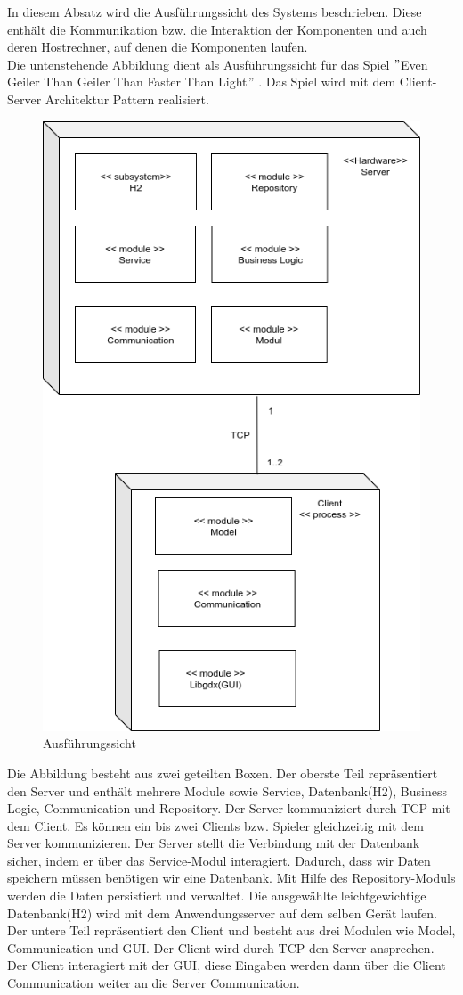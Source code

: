 \documentclass[fontsize=12pt,paper=a4,twoside]{scrartcl}
\begin{document}
In diesem Absatz wird die Ausführungssicht des Systems beschrieben. Diese enthält die Kommunikation bzw. die Interaktion der Komponenten und auch deren Hostrechner, auf denen die Komponenten laufen. \\Die untenstehende Abbildung dient als Ausführungssicht für das Spiel $ " $Even Geiler Than Geiler Than Faster Than Light$ "$ . Das Spiel wird mit dem Client-Server Architektur Pattern realisiert.\\
\begin{figure}[htp]
	\centering
	\includegraphics[width=0.5\linewidth]{pics/Ausfuehrungsicht_Diagram.png}
	\caption{Ausführungssicht}
	\label{fig2}
	
\end{figure}
\newpage
Die Abbildung besteht aus zwei geteilten Boxen. Der oberste Teil repräsentiert den Server und enthält mehrere Module sowie Service, Datenbank(H2), Business Logic, Communication und Repository. Der Server kommuniziert durch TCP mit dem Client. Es können ein bis zwei Clients bzw. Spieler gleichzeitig mit dem Server kommunizieren. Der Server stellt die Verbindung mit der Datenbank sicher, indem er über das Service-Modul interagiert. Dadurch, dass wir Daten speichern müssen benötigen wir eine Datenbank. Mit Hilfe des Repository-Moduls werden die Daten persistiert und verwaltet. Die ausgewählte leichtgewichtige Datenbank(H2) wird mit dem Anwendungsserver auf dem selben Gerät laufen. 
\\
Der untere Teil repräsentiert den Client und besteht aus drei Modulen wie Model, Communication und GUI. Der Client wird durch TCP den Server ansprechen. Der Client interagiert mit der GUI, diese Eingaben werden dann über die Client Communication weiter an die Server Communication.
\end{document}
